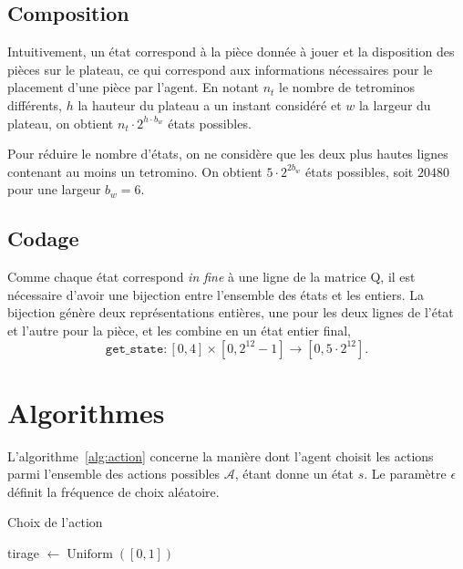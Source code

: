 \documentclass{report}
\DeclareMathOperator{\argmax}{argmax}
\DeclareMathOperator{\uniform}{Uniform}
\begin{document}
\subsection{Composition}
Intuitivement, un état correspond à la pièce donnée à jouer et la disposition
des pièces sur le plateau, ce qui correspond aux informations nécessaires pour
le placement d'une pièce par l'agent. En notant \(n_t\) le nombre de tetrominos
différents, \( h \) la hauteur du plateau a un instant considéré  et \(w\) la
largeur du plateau, on obtient \(n_t \cdot 2^{h \cdot b_w}\) états possibles.

Pour réduire le nombre d'états, on ne considère que les deux plus hautes lignes
contenant au moins un tetromino. On obtient \(5\cdot 2^{2 b_w}\) états
possibles, soit \(20480\) pour une largeur \( b_w = 6 \).

\subsection{Codage}
Comme chaque état correspond \textit{in fine} à une ligne de la matrice Q, il est
nécessaire d'avoir une bijection entre l'ensemble des états et les entiers. La
bijection génère deux représentations entières, une pour les deux lignes de
l'état et l'autre pour la pièce, et les combine en un état entier final,
\[
  \texttt{get\_state}\colon [0,4]\times [0, 2^{12} - 1] \to [0, 5\cdot 2^{12}].
\]


\section{Algorithmes}\label{sec:algorithmes}

L'algorithme~\ref{alg:action} concerne la manière dont l'agent choisit les
actions parmi l'ensemble des actions possibles \(\mathcal{A}\), étant donne un
état \(s\). Le paramètre \(\epsilon\) définit la fréquence de choix aléatoire.
\begin{algorithm}
  \caption{Choix de l'action}\label{alg:action}
  \begin{algorithmic}
    [1]
    \State{} tirage \(\gets \uniform([0, 1])\)
    \Return{\(\argmax_{a\in\mathcal{A}} Q(s, a)\)}
    \Else{}
    \Return{\(\uniform(\mathcal{A})\)}
    \EndIf{}
    \EndProcedure{}
  \end{algorithmic}
\end{algorithm}
\end{document}
